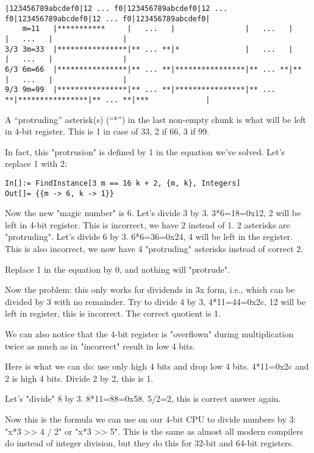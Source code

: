 \begin{lstlisting}[basicstyle=\scriptsize]
           |123456789abcdef0|12 ... f0|123456789abcdef0|12 ... f0|123456789abcdef0|12 ... f0|123456789abcdef0|
    m=11   |***********     |   ...   |                |   ...   |                |   ...   |                |
3/3 3m=33  |****************|** ... **|*               |   ...   |                |   ...   |                |
6/3 6m=66  |****************|** ... **|****************|** ... **|**              |   ...   |                |
9/3 9m=99  |****************|** ... **|****************|** ... **|****************|** ... **|***             |
\end{lstlisting}

A ``protruding'' asterisk(s) (``*'') in the last non-empty chunk is what will be left in 4-bit register.
This is 1 in case of 33, 2 if 66, 3 if 99.

In fact, this "protrusion" is defined by 1 in the equation we've solved.
Let's replace 1 with 2:

\begin{lstlisting}
In[]:= FindInstance[3 m == 16 k + 2, {m, k}, Integers]
Out[]= {{m -> 6, k -> 1}}
\end{lstlisting}

Now the new "magic number" is 6.
Let's divide 3 by 3. 3*6=18=0x12, 2 will be left in 4-bit register. This is incorrect, we have 2 instead of 1. 2 asterisks are "protruding".
Let's divide 6 by 3. 6*6=36=0x24, 4 will be left in the register. This is also incorrect, we now have 4 "protruding" asterisks instead of correct 2.

Replace 1 in the equation by 0, and nothing will "protrude".


Now the problem: this only works for dividends in 3x form, i.e., which can be divided by 3 with no remainder.
Try to divide 4 by 3, 4*11=44=0x2c, 12 will be left in register, this is incorrect.
The correct quotient is 1.

We can also notice that the 4-bit register is "overflown" during multiplication twice as much as in "incorrect" result in low 4 bits.

Here is what we can do: use only high 4 bits and drop low 4 bits.
4*11=0x2c and 2 is high 4 bits.
Divide 2 by 2, this is 1.

Let's "divide" 8 by 3. 8*11=88=0x58. 5/2=2, this is correct answer again.

Now this is the formula we can use on our 4-bit CPU to divide numbers by 3: "x*3 >> 4 / 2" or "x*3 >> 5".
This is the same as almost all modern compilers do instead of integer division, but they do this for 32-bit and 64-bit registers.

\levelup{}

